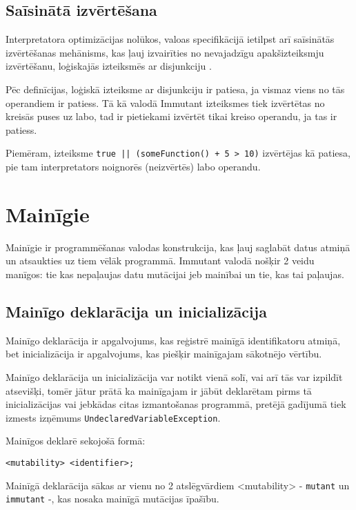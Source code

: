 \documentclass[12pt,a4paper]{report}
\begin{document}
\subsection{Saīsinātā izvērtēšana}

Interpretatora optimizācijas nolūkos, valoas specifikācijā ietilpst arī saīsinātās izvērtēšanas mehānisms, kas ļauj izvairīties no nevajadzīgu apakšizteiksmju izvērtēšanu, loģiskajās izteiksmēs ar disjunkciju \cite{short-circuit-logic}.

Pēc definīcijas, loģiskā izteiksme ar disjunkciju ir patiesa, ja vismaz viens no tās operandiem ir patiess.
Tā kā valodā Immutant izteiksmes tiek izvērtētas no kreisās puses uz labo, tad ir pietiekami izvērtēt tikai kreiso operandu, ja tas ir patiess.

Piemēram, izteiksme \texttt{true || (someFunction() + 5 > 10)} izvērtējas kā patiesa, pie tam interpretators noignorēs (neizvērtēs) labo operandu.

\section{Mainīgie}
\label{section:vars}

Mainīgie ir programmēšanas valodas konstrukcija, kas ļauj saglabāt datus atmiņā un atsaukties uz tiem vēlāk programmā. Immutant valodā nošķir 2 veidu manīgos: tie kas nepaļaujas datu mutācijai jeb mainībai un tie, kas tai paļaujas. 

\subsection{Mainīgo deklarācija un inicializācija}

Mainīgo deklarācija ir apgalvojums, kas reģistrē mainīgā identifikatoru atmiņā, bet inicializācija ir apgalvojums, kas piešķir mainīgajam sākotnējo vērtību.

Mainīgo deklarācija un inicializācija var notikt vienā solī, vai arī tās var izpildīt atsevišķi, tomēr jātur prātā ka mainīgajam ir jābūt deklarētam pirms tā inicializācijas vai jebkādas citas izmantošanas programmā, pretējā gadījumā tiek izmests izņēmums \texttt{UndeclaredVariableException}.

Mainīgos deklarē sekojošā formā:
\begin{verbatim}
<mutability> <identifier>;
\end{verbatim}


Mainīgā deklarācija sākas ar vienu no 2 atslēgvārdiem <mutability> - \texttt{mutant} un \texttt{immutant} -, kas nosaka mainīgā mutācijas īpašību. 
\end{document}
